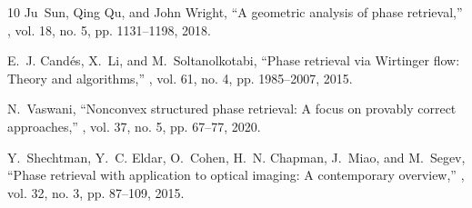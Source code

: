 \documentclass{article}
\begin{document}
\begin{thebibliography}{10}
Ju~Sun, Qing Qu, and John Wright,
\newblock ``A geometric analysis of phase retrieval,''
, vol. 18, no. 5, pp.
  1131--1198, 2018.

E.~J. {Cand{\'e}s}, X.~{Li}, and M.~{Soltanolkotabi},
\newblock ``Phase retrieval via {W}irtinger flow: Theory and algorithms,''
, vol. 61, no. 4, pp.
  1985--2007, 2015.

N.~{Vaswani},
\newblock ``Nonconvex structured phase retrieval: A focus on provably correct
  approaches,''
, vol. 37, no. 5, pp. 67--77,
  2020.

Y.~{Shechtman}, Y.~C. {Eldar}, O.~{Cohen}, H.~N. {Chapman}, J.~{Miao}, and
  M.~{Segev},
\newblock ``Phase retrieval with application to optical imaging: A contemporary
  overview,''
, vol. 32, no. 3, pp. 87--109,
  2015.

\end{thebibliography}
\end{document}
